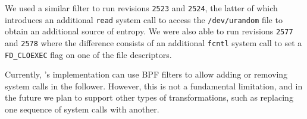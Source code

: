 

We used a similar filter to run revisions \lstinline`2523` and
\lstinline`2524`, the latter of which introduces an additional
\lstinline`read` system call to access the \lstinline`/dev/urandom`
file to obtain an additional source of entropy.  We were also able to
run revisions \lstinline`2577` and \lstinline`2578` where the
difference consists of an additional \lstinline`fcntl` system call to
set a \lstinline`FD_CLOEXEC` flag on one of the file descriptors.

Currently, \varan's implementation can use BPF filters to allow adding
or removing system calls in the follower.  However, this is not a
fundamental limitation, and in the future we plan
to support  other types of transformations, such as replacing one
sequence of system calls with another.





